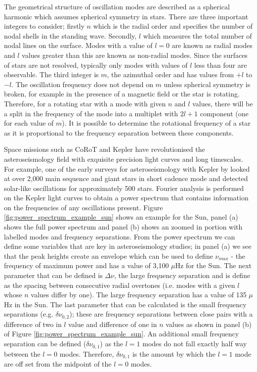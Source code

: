 The geometrical structure of oscillation modes are described as a spherical harmonic which assumes spherical symmetry in stars. There are three important integers to consider; firstly $n$ which is the radial order and specifies the number of nodal shells in the standing wave. Secondly, $l$ which measures the total number of nodal lines on the surface. Modes with a value of $l=0$ are known as radial modes and $l$ values greater than this are known as non-radial modes. Since the surfaces of stars are not resolved, typically only modes with values of $l$ less than four are observable. The third integer is $m$, the azimuthal order and has values from $+l$ to $-l$. The oscillation frequency does not depend on $m$ unless spherical symmetry is broken, for example in the presence of a magnetic field or the star is rotating. Therefore, for a rotating star with a mode with given $n$ and $l$ values, there will be a split in the frequency of the mode into a multiplet with $2l + 1$ component (one for each value of $m$). It is possible to determine the rotational frequency of a star as it is proportional to the frequency separation between these components.

Space missions such as CoRoT and Kepler have revolutionised the asteroseismology field with exquisite precision light curves and long timescales. For example, one of the early surveys for asteroseismology with Kepler by \citet{Chaplin_etal_2011} looked at over 2,000 main sequence and giant stars in short cadence mode and detected solar-like oscillations for approximately 500 stars. Fourier analysis is performed on the Kepler light curves to obtain a power spectrum that contains information on the frequencies of any oscillations present. Figure \ref{fig:power_spectrum_example_sun} shows an example for the Sun, panel (a) shows the full power spectrum and panel (b) shows an zoomed in portion with labelled modes and frequency separations. From the power spectrum we can define some variables that are key in asteroseismology studies; in panel (a) we see that the peak heights create an envelope which can be used to define $\nu_{max}$ - the frequency of maximum power and has a value of 3,100 $\mu$Hz for the Sun. The next parameter that can be defined is $\Delta \nu$, the large frequency separation and is define as the spacing between consecutive radial overtones (i.e. modes with a given $l$ whose $n$ values differ by one). The large frequency separation has a value of 135 $\mu$Hz in the Sun. The last parameter that can be calculated is the small frequency separations (e.g. $\delta \nu_{0,2}$); these are frequency separations between close pairs with a difference of two in $l$ value and difference of one in $n$ values as shown in panel (b) of Figure \ref{fig:power_spectrum_example_sun}. An additional small frequency separation can be defined ($\delta \nu_{0,1}$) as the $l=1$ modes do not fall exactly half way between the $l=0$ modes. Therefore, $\delta \nu_{0,1}$ is the amount by which the $l=1$ mode are off set from the midpoint of the $l=0$ modes.

